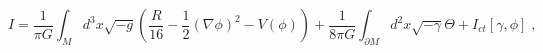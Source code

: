 \begin{equation}
I=\frac{1}{\pi G}\int_{M}d^{3}x\sqrt{-g}\left( \frac{R}{16}-\frac{1}{2}%
(\nabla \phi )^{2}-V(\phi )\right) +\frac{1}{8\pi G}\int_{\partial M}d^{2}x%
\sqrt{-\gamma }\Theta +I_{ct}[\gamma ,\phi ]\;,  \label{ITotal}
\end{equation}

